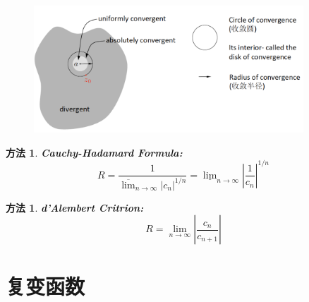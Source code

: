\documentclass[10pt, a4paper, oneside]{ctexbook}
\newtheorem{method}[theorem]{方法}
\begin{document}
\begin{figure}[h]
    \includegraphics[width=0.9\textwidth]{./assets/converge_radius.png}
\end{figure}
\begin{method}
    {\rm \textbf{Cauchy-Hadamard Formula: }}
    \begin{equation*}
        R=\frac{1}{\overline{\lim }_{n \rightarrow \infty}\left|c_{n}\right|^{1 / n}}=\underline{\lim }_{n \rightarrow \infty}\left|\frac{1}{c_{n}}\right|^{1 / n}
    \end{equation*}
\end{method}
\begin{method}
    {\rm \textbf{d'Alembert Critrion: }}
    \begin{equation*}
        R=\lim _{n \rightarrow \infty}\left|\frac{c_{n}}{c_{n+1}}\right|
    \end{equation*}
\end{method}

\chapter{复变函数}
\end{document}
